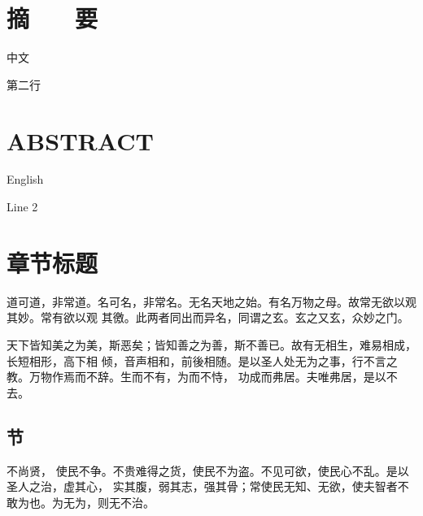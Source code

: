 \documentclass[a4paper, twoside, openany, extrafontsizes]{dlutthesis}
\begin{document}

\maketitle

\cleardoublepage
\makedeclaration

\frontmatter


\cleardoublepage
\chapter*{摘　　要}

中文

第二行


\cleardoublepage
\chapter*{ABSTRACT}

English

Line 2

\cleardoublepage


\begin{KeepFromToc}

\tableofcontents

\end{KeepFromToc}
\mainmatter

\chapter{章节标题}

道可道，非常道。名可名，非常名。无名天地之始。有名万物之母。故常无欲以观其妙。常有欲以观
其徼。此两者同出而异名，同谓之玄。玄之又玄，众妙之门。

天下皆知美之为美，斯恶矣；皆知善之为善，斯不善已。故有无相生，难易相成，长短相形，高下相
倾，音声相和，前後相随。是以圣人处无为之事，行不言之教。万物作焉而不辞。生而不有，为而不恃，
功成而弗居。夫唯弗居，是以不去。

\section{节}
\label{sec:section}

不尚贤， 使民不争。不贵难得之货，使民不为盗。不见可欲，使民心不乱。是以圣人之治，虚其心，
实其腹，弱其志，强其骨；常使民无知、无欲，使夫智者不敢为也。为无为，则无不治。
\end{document}
